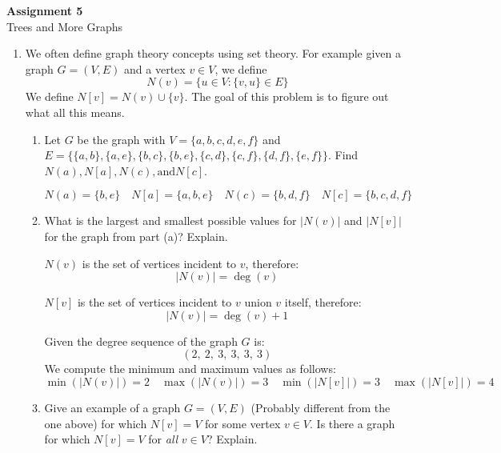 \documentclass[11pt, letterpaper, includehead]{article}
\theoremstyle{plain}
\theoremstyle{mydefinition}
\theoremstyle{myproperty}
\begin{document}
\pagestyle{fancy}
\fancyhead{}
\fancyfoot{}

\begin{center}
    \Large{\textbf{Assignment 5}}\\
    \Large{Trees and More Graphs}
\end{center}

\begin{enumerate}[label=\textbf{\arabic*}., leftmargin=*]
    \item We often define graph theory concepts using set theory. For example given a graph $G = (V, E)$ and a vertex $v \in V$, we define
    \[N(v) = \{ u \in V : \{v, u \} \in E\} \]
    We define $N[v] = N(v) \cup \{ v\} $. The goal of this problem is to figure out what all this means.

        
    \begin{enumerate}[label=(\alph*)]
        \item Let $G$ be the graph with $V = \{ a,b,c,d,e,f \} $ and
            \\$E = \{  \{ a,b \}, \{ a,e \},\{ b,c \}, \{ b,e \}, \{ c, d\}, \{ c, f\}, \{ d,f \}, \{ e,f \} \} $. 
            Find $N(a), N[a], N(c), \text{and} N[c]$.

                \[N(a) = \{b, e\} \quad
                N[a] = \{a, b, e\} \quad
                N(c) = \{b, d, f\} \quad 
                N[c] = \{b, c, d, f\}\]
        \item What is the largest and smallest possible values for $|N(v)|$ and $|N[v]|$ for the graph from part (a)? Explain.
        
            $N(v)$ is the set of vertices incident to $v$, therefore: 
            \[|N(v)| = \deg(v)\]

            $N[v]$ is the set of vertices incident to $v$ union $v$ itself, therefore: 
            \[|N(v)| = \deg(v) + 1\]

            Given the degree sequence of the graph $G$ is:
            \[
            (2,\ 2,\ 3,\ 3,\ 3,\ 3)
            \]
            We compute the minimum and maximum values as follows:
            \[
            \min(|N(v)|) = 2 \quad \max(|N(v)|) = 3 \quad \min(|N[v]|) = 3 \quad \max(|N[v]|) = 4
            \]

        \item Give an example of a graph $G = (V, E)$ (Probably different from the one above) for which $N[v] = V$ for some vertex $v \in V$. Is there a graph for which $N[v] = V$ for \emph{all} $v \in V$? Explain.
        

\end{enumerate}
\end{enumerate}
\end{document}
